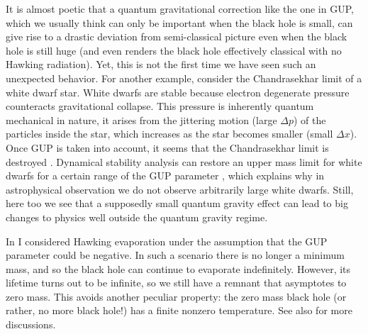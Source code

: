 \documentclass[12pt,preprintnumbers, floatfix, preprintnumbers, letterpaper, superscriptaddress,nofootinbib]{revtex4-2}
\begin{document}
It is almost poetic that a quantum gravitational correction like the one in GUP, which we usually think can only be important when the black hole is small, can give rise to a drastic deviation from semi-classical picture even when the black hole is still huge (and even renders the black hole effectively classical with no Hawking radiation). Yet, this is not the first time we have seen such an unexpected behavior. For another example, consider the Chandrasekhar limit of a white dwarf star. White dwarfs are stable because electron degenerate pressure counteracts gravitational collapse. This pressure is inherently quantum mechanical in nature, it arises from the jittering motion (large $\Delta p$) of the particles inside the star, which increases as the star becomes smaller (small $\Delta x$). Once GUP is taken into account, it seems that the Chandrasekhar limit is destroyed \cite{1512.06356,1804.05176}. Dynamical stability analysis can restore an upper mass limit for white dwarfs for a certain range of the GUP parameter \cite{2002.08360}, which explains why in astrophysical observation we do not observe arbitrarily large white dwarfs. Still, here too we see that a supposedly small quantum gravity effect can lead to big changes to physics well outside the quantum gravity regime.

In \cite{1806.03691} I considered Hawking evaporation under the assumption that the GUP parameter could be negative. In such a scenario there is no longer a minimum mass, and so the black hole can continue to evaporate indefinitely. However, its lifetime turns out to be infinite, so we still have a remnant that asymptotes to zero mass. This avoids another peculiar property: the zero mass black hole (or rather, no more black hole!) has a finite nonzero temperature. See also \cite{1812.03136} for more discussions.
\end{document}
